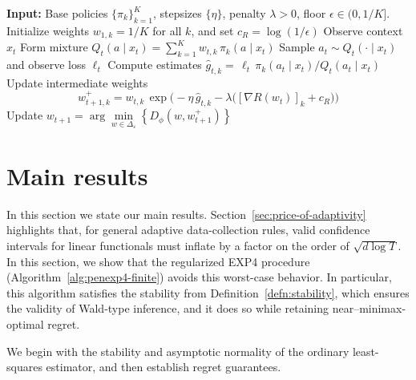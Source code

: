 \documentclass[11pt,letterpaper]{article}
\newcommand{\grad}{\nabla}
\newcommand{\loss}{\ell}
\theoremstyle{plain}
\theoremstyle{definition}  %
\begin{document}
\begin{algorithm}[H]
\caption{Regularized EXP4}
\label{alg:penexp4-finite}
\begin{algorithmic}[1]
\STATE \textbf{Input:} Base policies $\{\pi_{k}\}_{k=1}^K$, stepsizes $\{\eta\}$, penalty $\lambda>0$, floor $\epsilon\in(0,1/K]$.
\STATE Initialize weights $w_{1,k}=1/K$ for all $k$, and set $c_R = \log(1/\epsilon)$
    \STATE Observe context $x_t$
    \STATE Form mixture $Q_t(a\mid x_t)=\sum_{k=1}^K w_{t,k}\,\pi_k(a\mid x_t)$
    \STATE Sample $a_t\sim Q_t(\cdot\mid x_t)$ and observe loss $\loss_t$
    \STATE Compute estimates $\widehat{g}_{t,k}= \,\loss_t\,\pi_k(a_t\mid x_t)/Q_t(a_t\mid x_t)$
    \STATE Update intermediate weights
    \[
     w^{+}_{t+1,k}=w_{t,k}\,
    \exp\!\Big(-\eta \,\widehat g_{t,k}
              - \lambda\big( [\grad R(w_t)]_k + c_R \big)\Big)
    \]
    \STATE Update $w_{t+1} = \arg\min \limits_{w \in \Delta_\varepsilon} \left\lbrace  D_{\phi}(w, w_{t + 1}^{+})  \right\rbrace $
\ENDFOR
\end{algorithmic}
\end{algorithm}



\newcommand{\ratto}{\mathcal{V}_T}
\newcommand{\natto}{\mathcal{N}_T}
\newcommand{\delo}{\delta_{1,T}}
\newcommand{\deltoto}{\delta_{2,T}}
\newcommand{\expower}{\operatorname{exp}}
\newcommand{\laml}{\lambda^\star_L}
\newcommand{\lamu}{\lambda^\star_U}









\section{Main results}
\label{sec:main-results}
In this section we state our main results. 
Section~\ref{sec:price-of-adaptivity} highlights that, for general adaptive data-collection
rules, valid confidence intervals for linear functionals must inflate by a factor on the
order of $\sqrt{d \log T}$. In this section, we show that the regularized EXP4 procedure
(Algorithm~\ref{alg:penexp4-finite}) avoids this worst-case behavior. In particular, this algorithm satisfies the  stability from Definition~\ref{defn:stability}, which ensures
the validity of Wald-type inference, and it does so while retaining near--minimax-optimal regret.

We begin with the stability and asymptotic normality of the ordinary least-squares estimator, 
and then establish regret guarantees.
\end{document}
